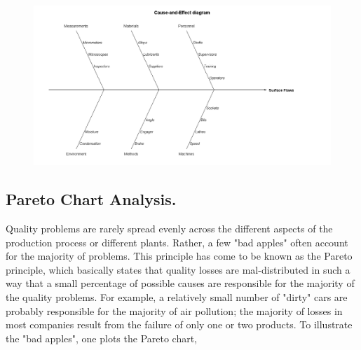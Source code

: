 \documentclass[]{article}
\begin{document}
\begin{figure}[h!]
\centering
\includegraphics[width=0.7\linewidth]{./qccfishbone}
\caption{}
\label{fig:qccfishbone}
\end{figure}

\newpage
\subsection{Pareto Chart Analysis.}
 Quality problems are rarely spread evenly across the different aspects of the production process or different plants. Rather, a few "bad apples" often account for the majority of problems. This principle has come to be known as the Pareto principle, which basically states that quality losses are mal-distributed in such a way that a small percentage of possible causes are responsible for the majority of the quality problems. For example, a relatively small number of "dirty" cars are probably responsible for the majority of air pollution; the majority of losses in most companies result from the failure of only one or two products. To illustrate the "bad apples", one plots the Pareto chart,
\newpage
\end{document}
